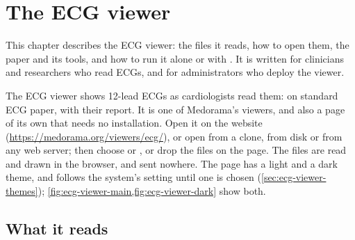 \chapter{The ECG viewer}
\label{chap:ecg-viewer}

This chapter describes the ECG viewer: the files it reads, how to open them, the paper and its
tools, and how to run it alone or with . It is written for clinicians and
researchers who read ECGs, and for administrators who deploy the viewer.

The ECG viewer shows 12-lead ECGs as cardiologists read them: on standard ECG paper, with their
report. It is one of Medorama's viewers, and also a page of its own that needs no installation.
Open it on the website (\url{https://medorama.org/viewers/ecg/}), or open
 from a clone, from disk or from any web server; then choose
 or , or drop the files on the page. The
files are read and drawn in the browser, and sent nowhere. The page has a light and a dark theme,
and follows the system's setting until one is chosen (\cref{sec:ecg-viewer-themes});
\cref{fig:ecg-viewer-main,fig:ecg-viewer-dark} show both.



\section{What it reads}
\label{sec:ecg-viewer-formats}

